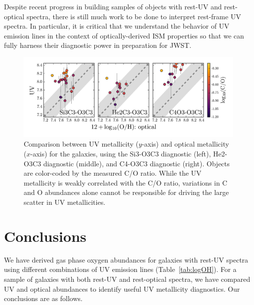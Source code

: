 \documentclass[preprint2]{aastex62}
\begin{document}
Despite recent progress in building samples of objects with rest-UV and rest-optical spectra, there is still much work to be done to interpret rest-frame UV spectra. In particular, it is critical that we understand the behavior of UV emission lines in the context of optically-derived ISM properties so that we can fully harness their diagnostic power in preparation for JWST.

\begin{figure}
  \begin{center}
    \includegraphics[width=\linewidth]{figs/f10.png}
    \caption{Comparison between UV metallicity ($y$-axis) and optical metallicity ($x$-axis) for the \citet{Berg+2016} galaxies, using the Si3-O3C3 diagnostic (left), He2-O3C3 diagnostic (middle), and C4-O3C3 diagnostic (right). Objects are color-coded by the measured C/O ratio. While the UV metallicity is weakly correlated with the C/O ratio, variations in C and O abundances alone cannot be responsible for driving the large scatter in UV metallicities.}
    \label{fig:CO}
  \end{center}
\end{figure}

\section{Conclusions}\label{sec:conclusions}
We have derived gas phase oxygen abundances for galaxies with rest-UV spectra using different combinations of UV emission lines (Table~\ref{tab:logOH}). For a sample of galaxies with both rest-UV and rest-optical spectra, we have compared UV and optical abundances to identify useful UV metallicity diagnostics. Our conclusions are as follows.
\end{document}
